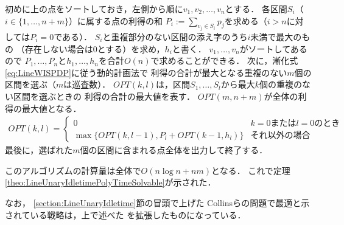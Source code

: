 初めに{\graphLine}上の点をソートしておき，左側から順に$v_1, v_2, \ldots, v_n$とする．
各区間$S_i$（$i \in \{ 1, \ldots, n + m \}$）に属する点の利得の和
$P_i := \sum_{v_j \in S_i} p_j$を求める（$i > n$に対しては$P_i = 0$である）．
$S_i$と重複部分のない区間の添え字のうち$i$未満で最大のもの
（存在しない場合は$0$とする）を求め，$h_i$と書く．
$v_1, \ldots, v_n$がソートしてあるので
$P_1, \ldots, P_n$と$h_1, \ldots, h_n$を合計$O(n)$で求めることができる．
%
次に，漸化式\eqref{eq:LineWISPDP}に従う動的計画法で
利得の合計が最大となる重複のない$m$個の区間を選ぶ（$m$は巡査数）．
$\mathit{OPT}(k, l)$は，区間$S_1, \ldots, S_l$から最大$k$個の重複のない区間を選ぶときの
利得の合計の最大値を表す．
$\mathit{OPT}(m, n + m)$が全体の利得の最大値となる．
\begin{align}
  \label{eq:LineWISPDP}
  \mathit{OPT}(k, l) = 
  \begin{cases}
    0 & \text{$k = 0$または$l = 0$のとき} \\
    \max \{
      \mathit{OPT}(k, l - 1), 
      P_l + \mathit{OPT}(k - 1, h_l)
    \}
    & \text{それ以外の場合}
  \end{cases}
\end{align}
最後に，選ばれた$m$個の区間に含まれる点全体を出力して終了する．

このアルゴリズムの計算量は全体で$O(n \log n + nm)$となる．
これで定理\ref{theo:LineUnaryIdletimePolyTimeSolvable}が示された．

なお，
\ref{section:LineUnaryIdletime}節の冒頭で上げた
Collinsらの問題で最適と示されている戦略は，上で述べた
{\sepSectPatroll}を拡張したものになっている\cite[Theorem 2.1]{collins2013optimal}．

